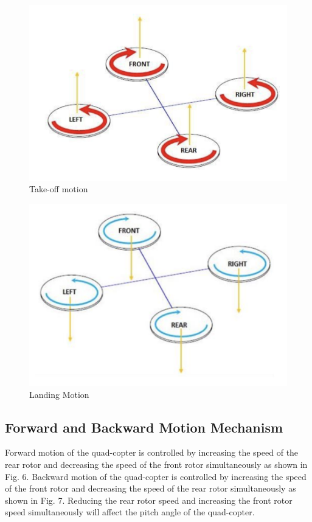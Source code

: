 \documentclass[a4paper,twoside]{iiththesis}
\begin{document}
\begin{figure}[h!]
\caption{Take-off motion}
\label{Take-off motion}
\centering
\includegraphics[width=\columnwidth]{./Figures/takeoff_qc.png}
\end{figure}

\begin{figure}[h!]
\caption{Landing Motion}
\label{Landing Motion}
\centering
\includegraphics[width=\columnwidth]{./Figures/landing_motion_qc.png}
\end{figure}

\subsection{Forward and Backward Motion Mechanism}
\par Forward motion of the quad-copter is controlled by increasing the speed of the rear rotor and decreasing the speed of the front rotor simultaneously as shown in Fig. 6. Backward motion of the quad-copter is controlled by increasing the speed of the front rotor and decreasing the speed of the rear rotor simultaneously as shown in Fig. 7. Reducing the rear rotor speed and increasing the front rotor speed simultaneously will affect the pitch angle of the quad-copter.
\end{document}
